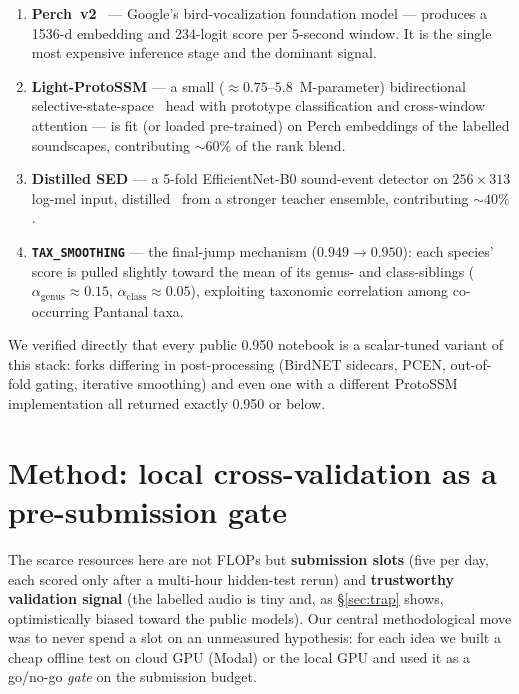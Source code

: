 \documentclass{ceurart}
\begin{document}
\begin{enumerate}
  \item \textbf{Perch~v2}~\cite{perch} --- Google's bird-vocalization foundation
        model --- produces a 1536-d embedding and 234-logit score per 5-second
        window. It is the single most expensive inference stage and the dominant
        signal.
  \item \textbf{Light-ProtoSSM} --- a small (${\approx}0.75$--$5.8$~M-parameter)
        bidirectional selective-state-space~\cite{mamba} head with prototype
        classification and cross-window attention --- is fit (or loaded
        pre-trained) on Perch embeddings of the labelled soundscapes, contributing
        ${\sim}60\%$ of the rank blend.
  \item \textbf{Distilled SED} --- a 5-fold EfficientNet-B0 sound-event detector on
        $256 \times 313$ log-mel input, distilled~\cite{distillation} from a
        stronger teacher ensemble, contributing ${\sim}40\%$.
  \item \textbf{\texttt{TAX\_SMOOTHING}} --- the final-jump mechanism
        ($0.949 \to 0.950$): each species' score is pulled slightly toward the mean
        of its genus- and class-siblings ($\alpha_{\text{genus}} \approx 0.15$,
        $\alpha_{\text{class}} \approx 0.05$), exploiting taxonomic correlation
        among co-occurring Pantanal taxa.
\end{enumerate}

We verified directly that every public 0.950 notebook is a scalar-tuned variant of
this stack: forks differing in post-processing (BirdNET sidecars, PCEN,
out-of-fold gating, iterative smoothing) and even one with a different ProtoSSM
implementation all returned exactly 0.950 or below.

\section{Method: local cross-validation as a pre-submission gate}
\label{sec:method}

The scarce resources here are not FLOPs but \textbf{submission slots} (five per
day, each scored only after a multi-hour hidden-test rerun) and \textbf{trustworthy
validation signal} (the labelled audio is tiny and, as \S\ref{sec:trap} shows,
optimistically biased toward the public models). Our central methodological move
was to never spend a slot on an unmeasured hypothesis: for each idea we built a
cheap offline test on cloud GPU (Modal) or the local GPU and used it as a
go/no-go \emph{gate} on the submission budget.
\end{document}
